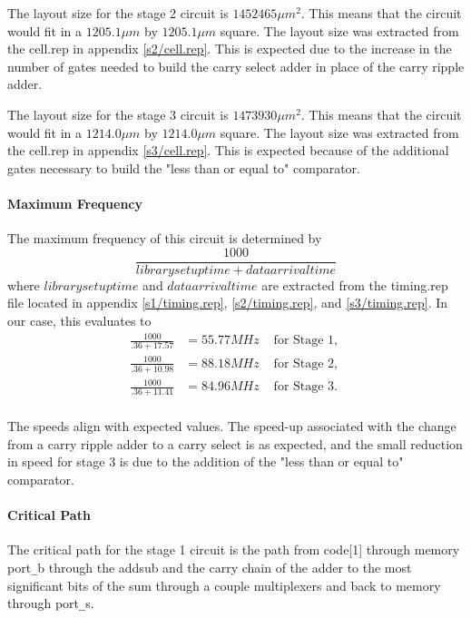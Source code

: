 \documentclass[11pt,letterpaper,final]{article}
\begin{document}
The layout size for the stage 2 circuit is $ 1452465 \mu m^2$.  This means that the circuit would fit in a $ 1205.1 \mu m $ by $ 1205.1 \mu m $ square. The layout size was extracted from the cell.rep in appendix \ref{s2/cell.rep}.  This is expected due to the increase in the number of gates needed to build the carry select adder in place of the carry ripple adder.

The layout size for the stage 3 circuit is $ 1473930 \mu m^2$.  This means that the circuit would fit in a $ 1214.0 \mu m $ by $ 1214.0 \mu m $ square. The layout size was extracted from the cell.rep in appendix \ref{s3/cell.rep}.  This is expected because of the additional gates necessary to build the "less than or equal to" comparator.
 
\paragraph{ Maximum Frequency }
The maximum frequency of this circuit is determined by 
\begin{equation}
\frac{1000}{library setup time + data arrival time} 
\end{equation}
where $librarysetuptime$ and $dataarrivaltime$ are extracted from the 
timing.rep file located in appendix \ref{s1/timing.rep}, \ref{s2/timing.rep}, and \ref{s3/timing.rep}.
In our case, this evaluates to 
\begin{align}
\frac{1000}{.36 + 17.57} &= 55.77 MHz &\mbox{ for Stage 1, } \\
\frac{1000}{.36 + 10.98} &= 88.18 MHz &\mbox{ for Stage 2, } \\
\frac{1000}{.36 + 11.41} &= 84.96 MHz &\mbox{ for Stage 3. } \\
\end{align}

The speeds align with expected values.  The speed-up associated with the change from a carry ripple adder to a carry select is as expected, and the small reduction in speed for stage 3 is due to the addition of the "less than or equal to" comparator.

\paragraph{ Critical Path } 

The critical path for the stage 1 circuit is the path from code[1] through memory port\verb=_=b through the addsub and the carry chain of the adder to the most significant bits of the sum through a couple multiplexers and back to memory through port\verb=_=s.
\end{document}

